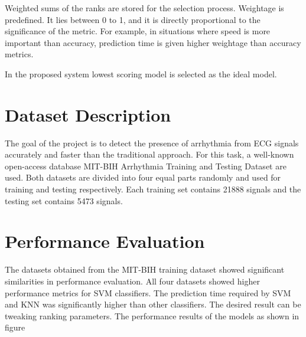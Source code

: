 Weighted sums of the ranks are stored for the selection process. Weightage is predefined. It lies between 0 to 1, and it is directly proportional to the significance of the metric. For example, in situations where speed is more important than accuracy, prediction time is given higher weightage than accuracy metrics.

In the proposed system lowest scoring model is selected as the ideal model.

\section{Dataset Description} \label{sec:dataset_description}
The goal of the project is to detect the presence of arrhythmia from ECG signals accurately and faster than the traditional approach. For this task, a well-known open-access database MIT-BIH Arrhythmia Training and Testing Dataset are used. Both datasets are divided into four equal parts randomly and used for training and testing respectively. Each training set contains 21888 signals and the testing set contains 5473 signals.

\section{Performance Evaluation} \label{sec:performance_evaluation}
The datasets obtained from the MIT-BIH training dataset showed significant similarities in performance evaluation. All four datasets showed higher performance metrics for SVM classifiers. The prediction time required by SVM and KNN was significantly higher than other classifiers. The desired result can be tweaking ranking parameters. The performance results of the models as shown in figure %


